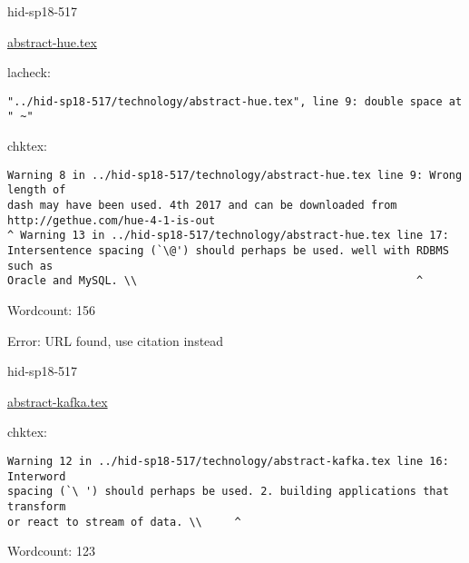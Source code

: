 \begin{IU}

hid-sp18-517

\href{https://github.com/cloudmesh-community/hid-sp18-517/blob/master//technology/abstract-hue.tex}{abstract-hue.tex}

 
lacheck:
\begin{tiny}
\begin{verbatim}
"../hid-sp18-517/technology/abstract-hue.tex", line 9: double space at " ~"
\end{verbatim}
\end{tiny}
chktex:
\begin{tiny}
\begin{verbatim}
Warning 8 in ../hid-sp18-517/technology/abstract-hue.tex line 9: Wrong length of
dash may have been used. 4th 2017 and can be downloaded from
http://gethue.com/hue-4-1-is-out
^ Warning 13 in ../hid-sp18-517/technology/abstract-hue.tex line 17:
Intersentence spacing (`\@') should perhaps be used. well with RDBMS such as
Oracle and MySQL. \\                                           ^
\end{verbatim}
\end{tiny}

Wordcount: 156

Error: URL found, use citation instead
\end{IU}



\begin{IU}

hid-sp18-517

\href{https://github.com/cloudmesh-community/hid-sp18-517/blob/master//technology/abstract-kafka.tex}{abstract-kafka.tex}

 
chktex:
\begin{tiny}
\begin{verbatim}
Warning 12 in ../hid-sp18-517/technology/abstract-kafka.tex line 16: Interword
spacing (`\ ') should perhaps be used. 2. building applications that transform
or react to stream of data. \\     ^
\end{verbatim}
\end{tiny}

Wordcount: 123

\end{IU}



